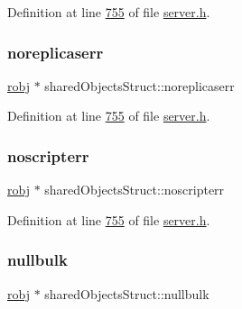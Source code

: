 Definition at line \hyperlink{server_8h_source_l00755}{755} of file \hyperlink{server_8h_source}{server.\+h}.

\mbox{\label{structsharedObjectsStruct_a96da6d4f27d667ef8edaf38c6b81ec93}} 
\subsubsection{\texorpdfstring{noreplicaserr}{noreplicaserr}}
{\footnotesize\ttfamily \hyperlink{structredisObject}{robj} $\ast$ shared\+Objects\+Struct\+::noreplicaserr}



Definition at line \hyperlink{server_8h_source_l00755}{755} of file \hyperlink{server_8h_source}{server.\+h}.

\mbox{\label{structsharedObjectsStruct_a445b6faf042877be051d83917d6b9c7f}} 
\subsubsection{\texorpdfstring{noscripterr}{noscripterr}}
{\footnotesize\ttfamily \hyperlink{structredisObject}{robj} $\ast$ shared\+Objects\+Struct\+::noscripterr}



Definition at line \hyperlink{server_8h_source_l00755}{755} of file \hyperlink{server_8h_source}{server.\+h}.

\mbox{\label{structsharedObjectsStruct_af4256ff7bc873725af649d9f7e674b44}} 
\subsubsection{\texorpdfstring{nullbulk}{nullbulk}}
{\footnotesize\ttfamily \hyperlink{structredisObject}{robj} $\ast$ shared\+Objects\+Struct\+::nullbulk}



